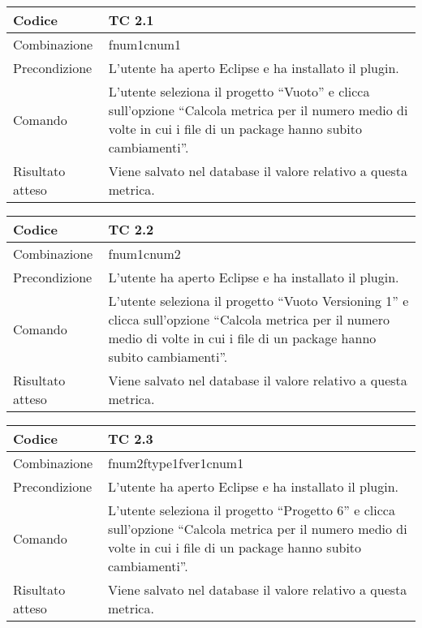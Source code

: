\begin{table}[ht]
\begin{tabular}{|p{3cm}|p{9cm}|}
\hline
\cellcolor{lightgray}Codice				& TC 2.1								\\
\hline
\cellcolor{lightgray}Combinazione		& fnum1cnum1								\\
\hline
\cellcolor{lightgray}Precondizione		& L'utente ha aperto Eclipse e ha installato il plugin.		\\
\hline
\cellcolor{lightgray}Comando			& L'utente seleziona il progetto ``Vuoto''  e clicca sull'opzione ``Calcola metrica per il numero medio di volte in cui i file di un package hanno subito cambiamenti''.	\\
\hline
\cellcolor{lightgray}Risultato atteso	& Viene salvato nel database il valore relativo a questa metrica.\\
\hline
\end{tabular}
\end{table}

\begin{table}[ht]
\begin{tabular}{|p{3cm}|p{9cm}|}
\hline
\cellcolor{lightgray}Codice				& TC 2.2								\\
\hline
\cellcolor{lightgray}Combinazione		& fnum1cnum2								\\
\hline
\cellcolor{lightgray}Precondizione		& L'utente ha aperto Eclipse e ha installato il plugin.		\\
\hline
\cellcolor{lightgray}Comando			& L'utente seleziona il progetto ``Vuoto Versioning 1''  e clicca sull'opzione ``Calcola metrica per il numero medio di volte in cui i file di un package hanno subito cambiamenti''.	\\
\hline
\cellcolor{lightgray}Risultato atteso	& Viene salvato nel database il valore relativo a questa metrica.\\
\hline
\end{tabular}
\end{table}

\begin{table}[ht]
\begin{tabular}{|p{3cm}|p{9cm}|}
\hline
\cellcolor{lightgray}Codice				& TC 2.3								\\
\hline
\cellcolor{lightgray}Combinazione		& fnum2ftype1fver1cnum1									\\
\hline
\cellcolor{lightgray}Precondizione		& L'utente ha aperto Eclipse e ha installato il plugin.		\\
\hline
\cellcolor{lightgray}Comando			& L'utente seleziona il progetto ``Progetto 6''  e clicca sull'opzione ``Calcola metrica per il numero medio di volte in cui i file di un package hanno subito cambiamenti''.	\\
\hline
\cellcolor{lightgray}Risultato atteso	& Viene salvato nel database il valore relativo a questa metrica.\\
\hline
\end{tabular}
\end{table}

